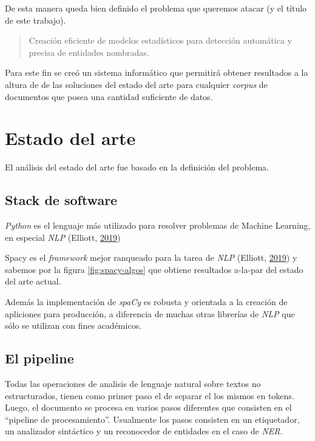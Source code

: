\documentclass[12pt,a4paper,]{scrartcl}
\begin{document}
De esta manera queda bien definido el problema que queremos atacar (y el título de este trabajo).

\begin{quote}
Creación eficiente de modelos estadísticos para detección automática y precisa de entidades nombradas.
\end{quote}

Para este fin se creó un sistema informático que permitirá obtener resultados a la altura de de las soluciones del estado del arte para cualquier \emph{corpus} de documentos que posea una cantidad suficiente de datos.

\newpage

\hypertarget{state-of-art}{%
\section{Estado del arte}\label{state-of-art}}

El análisis del estado del arte fue basado en la definición del problema.

\hypertarget{stack-de-software}{%
\subsection{Stack de software}\label{stack-de-software}}

\emph{Python} es el lenguaje más utilizado para resolver problemas de Machine Learning, en especial \emph{NLP} (Elliott, \protect\hyperlink{ref-github_machine_learning}{2019})

Spacy es el \emph{framework} mejor ranqueado para la tarea de \emph{NLP} (Elliott, \protect\hyperlink{ref-github_machine_learning}{2019}) y sabemos por la figura \ref{fig:spacy-algos} que obtiene resultados a-la-par del estado del arte actual.

Además la implementación de \emph{spaCy} es robusta y orientada a la creación de apliciones para producción, a diferencia de muchas otras librerías de \emph{NLP} que sólo se utilizan con fines académicos.

\hypertarget{el-pipeline}{%
\subsection{El pipeline}\label{el-pipeline}}

Todas las operaciones de analisis de lenguaje natural sobre textos no estructurados, tienen como primer paso el de separar el los mismos en tokens. Luego, el documento se procesa en varios pasos diferentes que consisten en el \enquote{pipeline de procesamiento}. Usualmente los pasos consisten en un etiquetador, un analizador sintáctico y un reconocedor de entidades en el caso de \emph{NER}.
\end{document}
